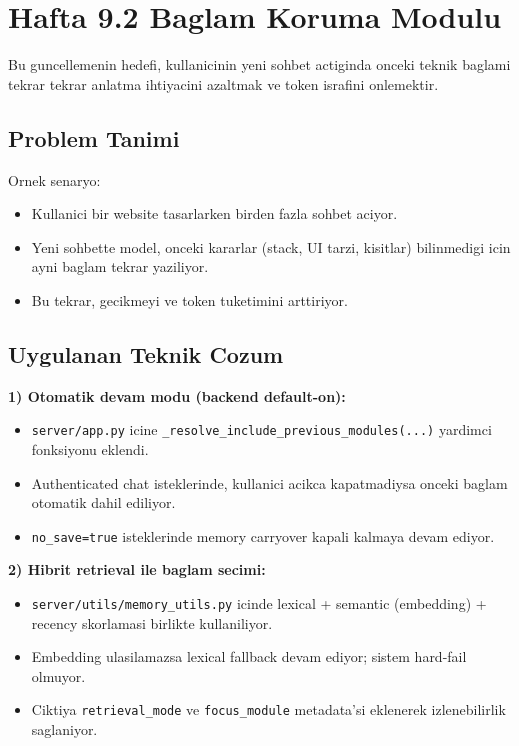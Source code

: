 \documentclass[11pt,a4paper]{article}
\begin{document}
\section{Hafta 9.2 Baglam Koruma Modulu}

Bu guncellemenin hedefi, kullanicinin yeni sohbet actiginda onceki teknik baglami tekrar tekrar anlatma ihtiyacini azaltmak ve token israfini onlemektir.

\subsection{Problem Tanimi}

Ornek senaryo:
\begin{itemize}[leftmargin=1.5em]
	\item Kullanici bir website tasarlarken birden fazla sohbet aciyor.
	\item Yeni sohbette model, onceki kararlar (stack, UI tarzi, kisitlar) bilinmedigi icin ayni baglam tekrar yaziliyor.
	\item Bu tekrar, gecikmeyi ve token tuketimini arttiriyor.
\end{itemize}

\subsection{Uygulanan Teknik Cozum}

\textbf{1) Otomatik devam modu (backend default-on):}
\begin{itemize}[leftmargin=1.5em]
	\item \texttt{server/app.py} icine \texttt{\_resolve\_include\_previous\_modules(...)} yardimci fonksiyonu eklendi.
	\item Authenticated chat isteklerinde, kullanici acikca kapatmadiysa onceki baglam otomatik dahil ediliyor.
	\item \texttt{no\_save=true} isteklerinde memory carryover kapali kalmaya devam ediyor.
\end{itemize}

\textbf{2) Hibrit retrieval ile baglam secimi:}
\begin{itemize}[leftmargin=1.5em]
	\item \texttt{server/utils/memory\_utils.py} icinde lexical + semantic (embedding) + recency skorlamasi birlikte kullaniliyor.
	\item Embedding ulasilamazsa lexical fallback devam ediyor; sistem hard-fail olmuyor.
	\item Ciktiya \texttt{retrieval\_mode} ve \texttt{focus\_module} metadata'si eklenerek izlenebilirlik saglaniyor.
\end{itemize}
\end{document}
